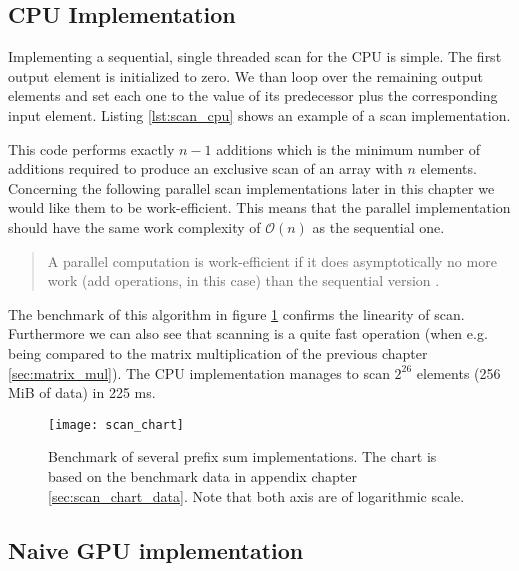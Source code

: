 \subsection{CPU Implementation}
\label{sec:scan_cpu}

Implementing a sequential, single threaded scan for the CPU is simple. The first output element is initialized to zero. We than loop over the remaining output elements and set each one to the value of its predecessor plus the corresponding input element. Listing \ref{lst:scan_cpu} shows an example of a scan implementation.



This code performs exactly $n - 1$ additions which is the minimum number of additions required to produce an exclusive scan of an array with $n$ elements. Concerning the following parallel scan implementations later in this chapter we would like them to be work-efficient. This means that the parallel implementation should have the same work complexity of $\mathcal{O}(n)$ as the sequential one.

\begin{quote}
A parallel computation is work-efficient if it does asymptotically no more work (add operations, in this case) than the sequential version \cite{gpu_gems_3_chapter_39}.
\end{quote}

The benchmark of this algorithm in figure \ref{fig:scan_chart} confirms the linearity of scan. Furthermore we can also see that scanning is a quite fast operation (when e.g. being compared to the matrix multiplication of the previous chapter \ref{sec:matrix_mul}). The CPU implementation manages to scan $2^{26}$ elements (256 MiB of data) in 225 ms.

\begin{figure}
\centering
\texttt{[image: scan\_chart]}
\caption{Benchmark of several prefix sum implementations. The chart is based on the benchmark data in appendix chapter \ref{sec:scan_chart_data}. Note that both axis are of logarithmic scale.}
\label{fig:scan_chart}
\end{figure}

\subsection{Naive GPU implementation}
\label{sec:scan_naive}

